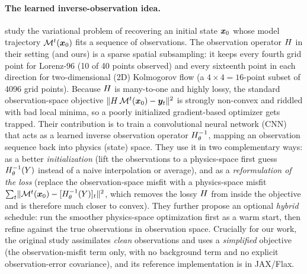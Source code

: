 \paragraph{The learned inverse-observation idea.}
\citet{frerix2021invobs} study the variational problem of recovering an initial state
$\bm{x}_0$ whose model trajectory $\mathcal{M}^t(\bm{x}_0)$ fits a sequence of observations.
The observation operator $H$ in their setting (and ours) is a sparse spatial
subsampling: it keeps every fourth grid point for Lorenz-96 (10 of 40 points observed)
and every sixteenth point in each direction for two-dimensional (2D) Kolmogorov flow (a
$4\times4=16$-point subset of 4096 grid points). Because $H$ is many-to-one and highly lossy,
the standard observation-space objective
$\lVert H\,\mathcal{M}^t(\bm{x}_0) - \bm{y}_t\rVert^2$ is strongly non-convex and riddled
with bad local minima, so a poorly initialized gradient-based optimizer gets trapped.
Their contribution is to train a convolutional neural network (CNN) that acts as a
learned inverse observation operator $H^{-1}_{\theta}$, mapping an observation sequence back into
physics (state) space. They use it in two complementary ways: as a better
\emph{initialization} (lift the observations to a physics-space first guess
$H^{-1}_{\theta}(Y)$ instead of a naive interpolation or average), and as a \emph{reformulation of
the loss} (replace the observation-space misfit with a physics-space misfit
$\sum_t \lVert \mathcal{M}^t(\bm{x}_0) - [H^{-1}_{\theta}(Y)]_t\rVert^2$, which removes the lossy $H$
from inside the objective and is therefore much closer to convex). They further propose
an optional \emph{hybrid} schedule: run the smoother physics-space optimization first as
a warm start, then refine against the true observations in observation space. Crucially
for our work, the original study assimilates \emph{clean} observations and uses a
\emph{simplified} objective (the observation-misfit term only, with no background term
and no explicit observation-error covariance), and its reference implementation is in
JAX/Flax.

